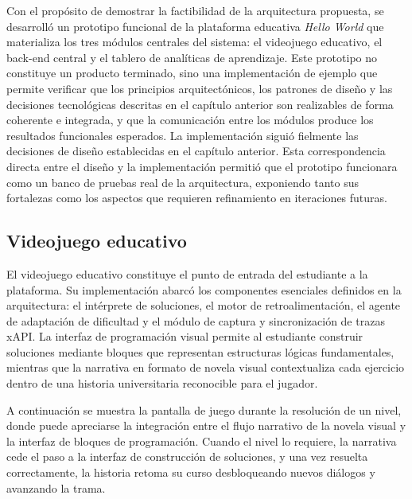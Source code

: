 Con el propósito de demostrar la factibilidad de la arquitectura propuesta, se desarrolló
un prototipo funcional de la plataforma educativa \textit{Hello World} que materializa los tres
módulos centrales del sistema: el videojuego educativo, el back-end central y el tablero
de analíticas de aprendizaje. Este prototipo no constituye un producto terminado, sino
una implementación de ejemplo que permite verificar que los principios arquitectónicos,
los patrones de diseño y las decisiones tecnológicas descritas en el capítulo anterior
son realizables de forma coherente e integrada, y que la comunicación entre los
módulos produce los resultados funcionales esperados. La implementación siguió fielmente las decisiones de diseño establecidas en el capítulo anterior. Esta correspondencia directa entre el diseño y la implementación permitió que el prototipo funcionara como un banco de pruebas real
de la arquitectura, exponiendo tanto sus fortalezas como los aspectos que requieren
refinamiento en iteraciones futuras.

\subsection*{Videojuego educativo}

El videojuego educativo constituye el punto de entrada del estudiante a la plataforma.
Su implementación abarcó los componentes esenciales definidos en la
arquitectura: el intérprete de soluciones, el motor de retroalimentación, el agente de
adaptación de dificultad y el módulo de captura y sincronización de trazas xAPI. La
interfaz de programación visual permite al estudiante construir soluciones mediante
bloques que representan estructuras lógicas fundamentales, mientras que la narrativa
en formato de novela visual contextualiza cada ejercicio dentro de una historia
universitaria reconocible para el jugador.



A continuación se muestra la pantalla de juego durante la resolución de un nivel,
donde puede apreciarse la integración entre el flujo narrativo de la novela visual y
la interfaz de bloques de programación. Cuando el nivel lo requiere, la narrativa
cede el paso a la interfaz de construcción de soluciones, y una vez resuelta
correctamente, la historia retoma su curso desbloqueando nuevos diálogos y avanzando
la trama.

